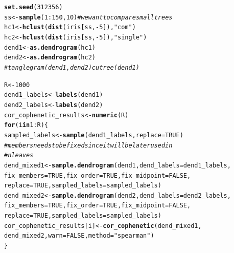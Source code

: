 \documentclass[shortnames,nojss,article]{jss}\usepackage[]{graphicx}\usepackage[]{color}
\makeatletter
\newcommand{\hlnum}[1]{\textcolor[rgb]{0.686,0.059,0.569}{#1}}%
\newcommand{\hlstr}[1]{\textcolor[rgb]{0.192,0.494,0.8}{#1}}%
\newcommand{\hlcom}[1]{\textcolor[rgb]{0.678,0.584,0.686}{\textit{#1}}}%
\newcommand{\hlopt}[1]{\textcolor[rgb]{0,0,0}{#1}}%
\newcommand{\hlstd}[1]{\textcolor[rgb]{0.345,0.345,0.345}{#1}}%
\newcommand{\hlkwa}[1]{\textcolor[rgb]{0.161,0.373,0.58}{\textbf{#1}}}%
\newcommand{\hlkwb}[1]{\textcolor[rgb]{0.69,0.353,0.396}{#1}}%
\newcommand{\hlkwc}[1]{\textcolor[rgb]{0.333,0.667,0.333}{#1}}%
\newcommand{\hlkwd}[1]{\textcolor[rgb]{0.737,0.353,0.396}{\textbf{#1}}}%
\newenvironment{kframe}{%
 \def\at@end@of@kframe{}%
 \ifinner\ifhmode%
  \def\at@end@of@kframe{\end{minipage}}%
  \begin{minipage}{\columnwidth}%
 \fi\fi%
 \def\FrameCommand##1{\hskip\@totalleftmargin \hskip-\fboxsep
 \colorbox{shadecolor}{##1}\hskip-\fboxsep
     \hskip-\linewidth \hskip-\@totalleftmargin \hskip\columnwidth}%
 \MakeFramed {\advance\hsize-\width
   \@totalleftmargin\z@ \linewidth\hsize
   \@setminipage}}%
 {\par\unskip\endMakeFramed%
 \at@end@of@kframe}
\newenvironment{knitrout}{}{} %
\makeatother
\begin{document}
\begin{knitrout}
\color{fgcolor}\begin{kframe}
\begin{alltt}
\hlkwd{set.seed}\hlstd{(}\hlnum{312356}\hlstd{)}
\hlstd{ss} \hlkwb{<-} \hlkwd{sample}\hlstd{(}\hlnum{1}\hlopt{:}\hlnum{150}\hlstd{,} \hlnum{10}\hlstd{)}  \hlcom{# we want to compare small trees}
\hlstd{hc1} \hlkwb{<-} \hlkwd{hclust}\hlstd{(}\hlkwd{dist}\hlstd{(iris[ss,} \hlopt{-}\hlnum{5}\hlstd{]),} \hlstr{"com"}\hlstd{)}
\hlstd{hc2} \hlkwb{<-} \hlkwd{hclust}\hlstd{(}\hlkwd{dist}\hlstd{(iris[ss,} \hlopt{-}\hlnum{5}\hlstd{]),} \hlstr{"single"}\hlstd{)}
\hlstd{dend1} \hlkwb{<-} \hlkwd{as.dendrogram}\hlstd{(hc1)}
\hlstd{dend2} \hlkwb{<-} \hlkwd{as.dendrogram}\hlstd{(hc2)}
\hlcom{# tanglegram(dend1, dend2) cutree(dend1)}

\hlstd{R} \hlkwb{<-} \hlnum{1000}
\hlstd{dend1_labels} \hlkwb{<-} \hlkwd{labels}\hlstd{(dend1)}
\hlstd{dend2_labels} \hlkwb{<-} \hlkwd{labels}\hlstd{(dend2)}
\hlstd{cor_cophenetic_results} \hlkwb{<-} \hlkwd{numeric}\hlstd{(R)}
\hlkwa{for} \hlstd{(i} \hlkwa{in} \hlnum{1}\hlopt{:}\hlstd{R) \{}
    \hlstd{sampled_labels} \hlkwb{<-} \hlkwd{sample}\hlstd{(dend1_labels,} \hlkwc{replace} \hlstd{=} \hlnum{TRUE}\hlstd{)}
    \hlcom{# members needs to be fixed since it will be later used in}
    \hlcom{# nleaves}
    \hlstd{dend_mixed1} \hlkwb{<-} \hlkwd{sample.dendrogram}\hlstd{(dend1,} \hlkwc{dend_labels} \hlstd{= dend1_labels,}
        \hlkwc{fix_members} \hlstd{=} \hlnum{TRUE}\hlstd{,} \hlkwc{fix_order} \hlstd{=} \hlnum{TRUE}\hlstd{,} \hlkwc{fix_midpoint} \hlstd{=} \hlnum{FALSE}\hlstd{,}
        \hlkwc{replace} \hlstd{=} \hlnum{TRUE}\hlstd{,} \hlkwc{sampled_labels} \hlstd{= sampled_labels)}
    \hlstd{dend_mixed2} \hlkwb{<-} \hlkwd{sample.dendrogram}\hlstd{(dend2,} \hlkwc{dend_labels} \hlstd{= dend2_labels,}
        \hlkwc{fix_members} \hlstd{=} \hlnum{TRUE}\hlstd{,} \hlkwc{fix_order} \hlstd{=} \hlnum{TRUE}\hlstd{,} \hlkwc{fix_midpoint} \hlstd{=} \hlnum{FALSE}\hlstd{,}
        \hlkwc{replace} \hlstd{=} \hlnum{TRUE}\hlstd{,} \hlkwc{sampled_labels} \hlstd{= sampled_labels)}
    \hlstd{cor_cophenetic_results[i]} \hlkwb{<-} \hlkwd{cor_cophenetic}\hlstd{(dend_mixed1,}
        \hlstd{dend_mixed2,} \hlkwc{warn} \hlstd{=} \hlnum{FALSE}\hlstd{,} \hlkwc{method} \hlstd{=} \hlstr{"spearman"}\hlstd{)}
\hlstd{\}}



\end{alltt}
\end{kframe}
\end{knitrout}
\end{document}
